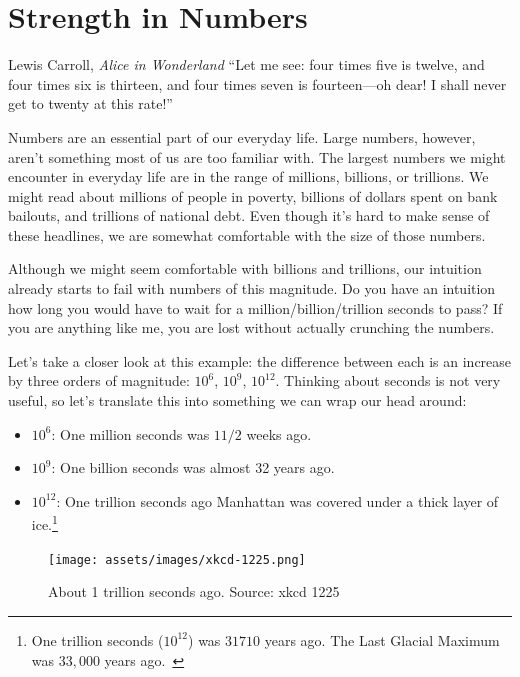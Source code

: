 \chapter{Strength in Numbers}
\label{les:15}

\begin{chapquote}{Lewis Carroll, \textit{Alice in Wonderland}}
\enquote{Let me see: four times five is twelve, and four times six is thirteen, and
four times seven is fourteen—oh dear! I shall never get to twenty at this
rate!}
\end{chapquote}

Numbers are an essential part of our everyday life. Large numbers,
however, aren't something most of us are too familiar with. The largest
numbers we might encounter in everyday life are in the range of
millions, billions, or trillions. We might read about millions of people
in poverty, billions of dollars spent on bank bailouts, and trillions of
national debt. Even though it's hard to make sense of these headlines,
we are somewhat comfortable with the size of those numbers.

Although we might seem comfortable with billions and trillions, our
intuition already starts to fail with numbers of this magnitude. Do you
have an intuition how long you would have to wait for a
million/billion/trillion seconds to pass? If you are anything like me,
you are lost without actually crunching the numbers.

Let's take a closer look at this example: the difference between each is an
increase by three orders of magnitude: $10^6$, $10^9$, $10^{12}$. Thinking about
seconds is not very useful, so let's translate this into something we can wrap
our head around:

\begin{itemize}
  \item $10^6$: One million seconds was $1 1/2$ weeks ago.
  \item $10^9$: One billion seconds was almost 32 years ago.
  \item $10^{12}$: One trillion seconds ago Manhattan was covered under a thick
  layer of ice.\footnote{One trillion seconds ($10^{12}$) was $31710$ years ago. The Last Glacial
  Maximum was $33,000$ years ago.~\cite{wiki:LGM}}
\end{itemize}

\begin{figure}
  \texttt{[image: assets/images/xkcd-1225.png]}
  \caption{About 1 trillion seconds ago. Source: xkcd 1225}
  \label{fig:xkcd-1225}
\end{figure}

